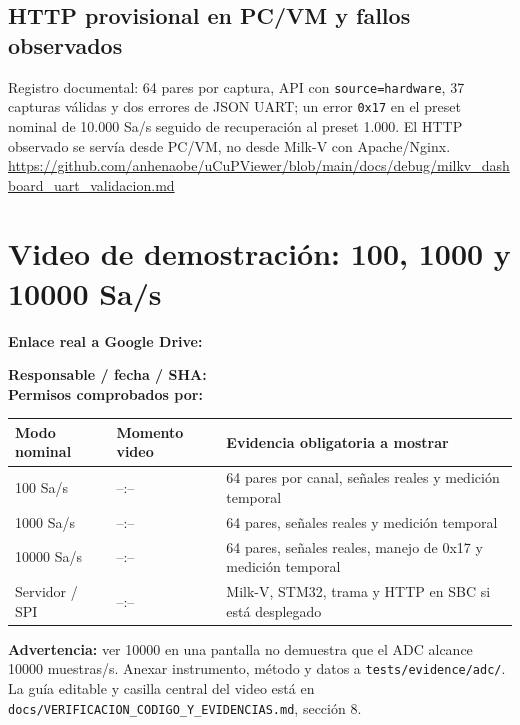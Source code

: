 \documentclass[11pt,a4paper]{article}
\begin{document}
\subsection{HTTP provisional en PC/VM y fallos observados}
Registro documental: 64 pares por captura, API con \texttt{source=hardware},
37 capturas válidas y dos errores de JSON UART; un error \texttt{0x17} en
el preset nominal de 10.000 Sa/s seguido de recuperación al preset 1.000.
El HTTP observado se servía desde PC/VM, no desde Milk-V con Apache/Nginx.
\url{https://github.com/anhenaobe/uCuPViewer/blob/main/docs/debug/milkv_dashboard_uart_validacion.md}

\section{Video de demostración: 100, 1000 y 10000 Sa/s}
\noindent\textbf{Enlace real a Google Drive:}\par\smallskip
\noindent{}\par\medskip
\noindent\textbf{Responsable / fecha / SHA:} \underline{\hspace{65mm}}\\
\textbf{Permisos comprobados por:} \underline{\hspace{65mm}}\par\medskip
\begin{center}
\begin{tabular}{p{27mm}p{26mm}p{92mm}}
\toprule
Modo nominal & Momento video & Evidencia obligatoria a mostrar\\\midrule
100 Sa/s & --:-- & 64 pares por canal, señales reales y medición temporal\\
1000 Sa/s & --:-- & 64 pares, señales reales y medición temporal\\
10000 Sa/s & --:-- & 64 pares, señales reales, manejo de 0x17 y medición temporal\\
Servidor / SPI & --:-- & Milk-V, STM32, trama y HTTP en SBC si está desplegado\\
\bottomrule
\end{tabular}
\end{center}
\textbf{Advertencia:} ver 10000 en una pantalla no demuestra que el ADC alcance
10000 muestras/s. Anexar instrumento, método y datos a \texttt{tests/evidence/adc/}.
La guía editable y casilla central del video está en
\texttt{docs/VERIFICACION\_CODIGO\_Y\_EVIDENCIAS.md}, sección 8.
\end{document}
